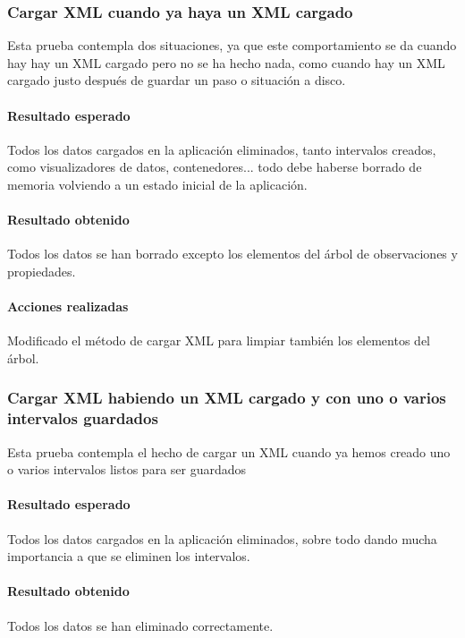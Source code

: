 \subsubsection{Cargar XML cuando ya haya un XML cargado}
Esta prueba contempla dos situaciones, 
ya que este comportamiento se da cuando hay
hay un XML cargado pero no se ha hecho nada, como cuando hay un XML cargado justo
despu\'es de guardar un paso o situaci\'on a disco.

\paragraph{Resultado esperado}
Todos los datos cargados en la aplicaci\'on eliminados, 
tanto intervalos creados, como visualizadores de datos,
contenedores... todo debe haberse borrado de memoria volviendo a un estado inicial
de la aplicaci\'on.

\paragraph{Resultado obtenido}
Todos los datos se han borrado excepto los elementos del \'arbol de observaciones
y propiedades. 

\paragraph{Acciones realizadas}
Modificado el m\'etodo de cargar XML para limpiar tambi\'en los elementos del
\'arbol.

\subsubsection{Cargar XML habiendo un XML cargado y con uno o varios intervalos guardados}
Esta prueba contempla el hecho de cargar un XML cuando ya hemos creado uno o varios
intervalos listos para ser guardados

\paragraph{Resultado esperado}
Todos los datos cargados en la aplicaci\'on eliminados, sobre todo dando mucha importancia a
que se eliminen los intervalos.

\paragraph{Resultado obtenido}
Todos los datos se han eliminado correctamente.

